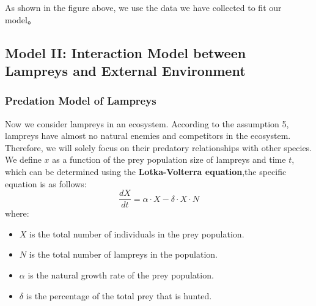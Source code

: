 \documentclass[12pt]{article}  %
\begin{document}
As shown in the figure above, we use the data we have collected to fit our model。
\subsection{Model II: Interaction Model between Lampreys and External Environment}
\subsubsection{Predation Model of Lampreys}
Now we consider lampreys in an ecosystem.  According to the assumption 5, lampreys have almost no natural enemies and competitors in the ecosystem.
 Therefore, we will solely focus on their predatory relationships with other species.  We define $x$ as a function of the prey population size of lampreys and time $t$, which can be determined using the \textbf{Lotka-Volterra equation},the specific equation is as follows:
\begin{equation}
	\frac{dX}{dt}=\alpha\cdot X-\delta \cdot X\cdot N
\end{equation}
where:
\begin{itemize}
	\setlength{\parsep}{0ex} %
	\setlength{\topsep}{2ex} %
	\setlength{\itemsep}{1ex} %
	\item $X$ is the total number of individuals in the prey population.
	\item $N$ is the total number of lampreys in the population.
	\item $\alpha$  is the natural growth rate of the prey population.
	\item $\delta $ is the percentage of the total prey that is hunted.
\end{itemize}
\end{document}
